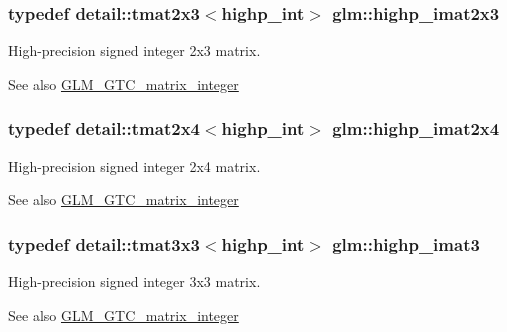 \subsubsection[{highp\+\_\+imat2x3}]{\setlength{\rightskip}{0pt plus 5cm}typedef detail\+::tmat2x3$<$highp\+\_\+int$>$ {\bf glm\+::highp\+\_\+imat2x3}}\label{group__gtc__matrix__integer_ga06f89e9faac42bc0ac6628e83244a488}
High-\/precision signed integer 2x3 matrix. \begin{DoxySeeAlso}{See also}
\hyperlink{group__gtc__matrix__integer}{G\+L\+M\+\_\+\+G\+T\+C\+\_\+matrix\+\_\+integer} 
\end{DoxySeeAlso}
\hypertarget{group__gtc__matrix__integer_gaf9ce65229f4b8fe1e956b83ca82cdfa7}{}
\subsubsection[{highp\+\_\+imat2x4}]{\setlength{\rightskip}{0pt plus 5cm}typedef detail\+::tmat2x4$<$highp\+\_\+int$>$ {\bf glm\+::highp\+\_\+imat2x4}}\label{group__gtc__matrix__integer_gaf9ce65229f4b8fe1e956b83ca82cdfa7}
High-\/precision signed integer 2x4 matrix. \begin{DoxySeeAlso}{See also}
\hyperlink{group__gtc__matrix__integer}{G\+L\+M\+\_\+\+G\+T\+C\+\_\+matrix\+\_\+integer} 
\end{DoxySeeAlso}
\hypertarget{group__gtc__matrix__integer_gab7c4db50bdedef67e45ce7d4ae68e567}{}
\subsubsection[{highp\+\_\+imat3}]{\setlength{\rightskip}{0pt plus 5cm}typedef detail\+::tmat3x3$<$highp\+\_\+int$>$ {\bf glm\+::highp\+\_\+imat3}}\label{group__gtc__matrix__integer_gab7c4db50bdedef67e45ce7d4ae68e567}
High-\/precision signed integer 3x3 matrix. \begin{DoxySeeAlso}{See also}
\hyperlink{group__gtc__matrix__integer}{G\+L\+M\+\_\+\+G\+T\+C\+\_\+matrix\+\_\+integer} 
\end{DoxySeeAlso}
\hypertarget{group__gtc__matrix__integer_gab33e4ccf70f2e1f2eae7c6ddfb594e3c}{}
